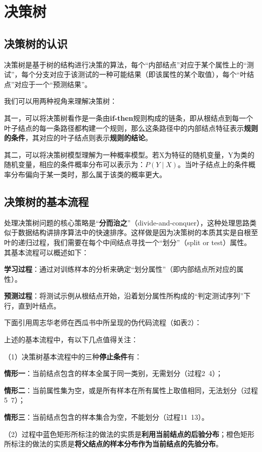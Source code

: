 \section{决策树}

\subsection{决策树的认识}
决策树是基于树的结构进行决策的算法，每个“内部结点”对应于某个属性上的“测试”，每个分支对应于该测试的一种可能结果（即该属性的某个取值），每个“叶结点”对应于一个“预测结果”。

我们可以用两种视角来理解决策树：

其一，可以将决策树看作是一条由\textbf{if-then}规则构成的链条，即从根结点到每一个叶子结点的每一条路径都构建一个规则，那么这条路径中的内部结点特征表示\textbf{规则的条件}，其对应的叶子结点则表示\textbf{规则的结论}。

其二，可以将决策树模型理解为一种概率模型。若X为特征的随机变量，Y为类的随机变量，相应的条件概率分布可以表示为：$P(Y \mid X)$。当叶子结点上的条件概率分布偏向于某一类时，那么属于该类的概率更大。

\subsection{决策树的基本流程}
处理决策树问题的核心策略是“\textbf{分而治之}”（divide-and-conquer），这种处理思路类似于数据结构讲排序算法中的快速排序。这样做是因为决策树的本质其实是自根至叶的递归过程，我们需要在每个中间结点寻找一个“划分”（split or test）属性。其基本流程可以概述如下：

\textbf{学习过程}：通过对训练样本的分析来确定“划分属性”（即内部结点所对应的属性）。

\textbf{预测过程}：将测试示例从根结点开始，沿着划分属性所构成的“判定测试序列”下行，直到叶结点。

下面引用周志华老师在西瓜书中所呈现的伪代码流程（如表2）：

上述的基本流程中，有以下几点值得关注：

（1）决策树基本流程中的三种\textbf{停止条件}有：

\textbf{情形一}：当前结点包含的样本全属于同一类别，无需划分（过程2~4）；

\textbf{情形二}：当前属性集为空，或是所有样本在所有属性上取值相同，无法划分（过程5~7）；

\textbf{情形三}：当前结点包含的样本集合为空，不能划分（过程11~13）。

（2）过程中蓝色矩形所标注的做法的实质是\textbf{利用当前结点的后验分布}；橙色矩形所标注的做法的实质是\textbf{将父结点的样本分布作为当前结点的先验分布}。

